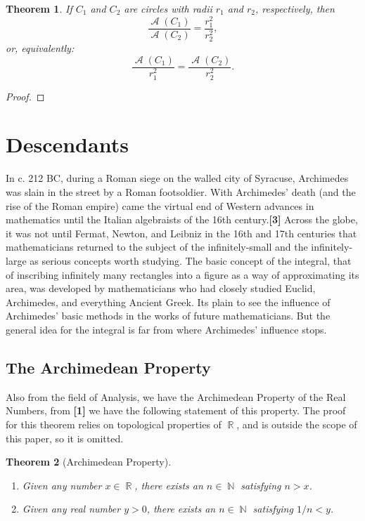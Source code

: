 \documentclass[letterpaper, 12pt]{amsart}
\DeclareMathOperator{\N}{\mathbb{N}}
\DeclareMathOperator{\R}{\mathbb{R}}
\DeclareMathOperator{\A}{\mathcal{A}}
\newtheorem{thm}{Theorem}[section]
\theoremstyle{definition}  %
\begin{document}
		\begin{thm}
		If $C_{1}$ and $C_{2}$ are circles with radii $r_{1}$ and $r_{2}$, respectively, then $$\frac{\A(C_{1})}{\A(C_{2})} = \frac{r_{1}^{2}}{r_{2}^{2}},$$ or, equivalently: $$\frac{\A(C_{1})}{r_{1}^{2}} = \frac{\A(C_{2})}{r_{2}^{2}}.$$
		\end{thm}
		\begin{proof}
		\end{proof}

	\section{Descendants}
	\label{sec:descendants}
	In c. 212 BC, during a Roman siege on the walled city of Syracuse, Archimedes was slain in the street by a Roman footsoldier.
	With Archimedes' death (and the rise of the Roman empire) came the virtual end of Western advances in mathematics until the Italian algebraists of the 16th century.\textbf{[3]}
	Across the globe, it was not until Fermat, Newton, and Leibniz in the 16th and 17th centuries that mathematicians returned to the subject of the infinitely-small and the infinitely-large as serious concepts worth studying.
	The basic concept of the integral, that of inscribing infinitely many rectangles into a figure as a way of approximating its area, was developed by mathematicians who had closely studied Euclid, Archimedes, and everything Ancient Greek.
	Its plain to see the influence of Archimedes' basic methods in the works of future mathematicians.
	But the general idea for the integral is far from where Archimedes' influence stops.

		\subsection{The Archimedean Property}
		\label{sub:the_archimedean_property}
		Also from the field of Analysis, we have the Archimedean Property of the Real Numbers, from \textbf{[1]} we have the following statement of this property.
		The proof for this theorem relies on topological properties of $\R$, and is outside the scope of this paper, so it is omitted.
		\begin{thm}[Archimedean Property]
		\
			\begin{enumerate}
				\item Given any number $x \in \R$, there exists an $n \in \N$ satisfying $n > x$.
				\item Given any real number $y > 0$, there exists an $n \in \N$ satisfying $1/n < y$.
			\end{enumerate}
		\end{thm}
		
\end{document}
